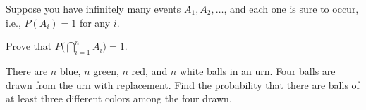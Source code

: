 \begin{problem}
  Suppose you have infinitely many events \(A_1,A_2,\dotsc\), and each one
  is sure to occur, i.e., \(P(A_i)=1\) for any \(i\).

  Prove that \(P\bigl(\bigcap_{i=1}^n A_i\bigr)=1\).
\end{problem}
\begin{solution}

\end{solution}
\newpage

\begin{problem}
  There are \(n\) blue, \(n\) green, \(n\) red, and \(n\) white balls in an
  urn. Four balls are drawn from the urn with replacement. Find the
  probability that there are balls of at least three different colors among
  the four drawn.
\end{problem}
\begin{solution}

\end{solution}

